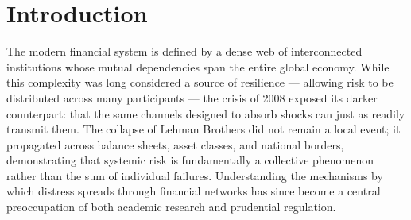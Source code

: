 \documentclass[a4paper,12pt,twoside]{article}
\begin{document}



\setcounter{page}{3}




\section{Introduction}
\label{sec:introduction}

The modern financial system is defined by a dense web of interconnected 
institutions whose mutual dependencies span the entire global economy. 
While this complexity was long considered a source of resilience --- 
allowing risk to be distributed across many participants --- the crisis 
of 2008 exposed its darker counterpart: that the same channels designed 
to absorb shocks can just as readily transmit them. The collapse of 
Lehman Brothers did not remain a local event; it propagated across 
balance sheets, asset classes, and national borders, demonstrating that 
systemic risk is fundamentally a collective phenomenon rather than the 
sum of individual failures. Understanding the mechanisms by which 
distress spreads through financial networks has since become a central 
preoccupation of both academic research and prudential regulation.
\end{document}
